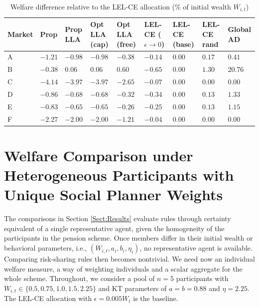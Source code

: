 \documentclass[11pt,a4paper]{article}
\theoremstyle{definition}
\theoremstyle{plain}
\theoremstyle{remark}
\newcommand{\1}{\mathbf{1}}
\begin{document}
\begin{table}[htbp]
  \centering
  \small
  \caption{Welfare difference relative to the LEL-CE allocation (\% of initial wealth $W_{i,t}$)}
  \label{tab:welfare_diff_LEL}
  \vspace{0.5em}
  \setlength{\tabcolsep}{3pt} %
  \begin{tabularx}{\textwidth}{l *{8}{Y}}
    \toprule
    \textbf{Market} & 
    \textbf{Prop} & 
    \textbf{Prop} \newline \textbf{LLA} & 
    \textbf{Opt LLA} \newline \textbf{(cap)} & 
    \textbf{Opt LLA} \newline \textbf{(free)} & 
    \textbf{LEL-CE} \newline \textbf{($\epsilon \to 0$)} & 
    \textbf{LEL-CE} \newline \textbf{(base)} & 
    \textbf{LEL-CE} \newline \textbf{rand} & 
    \textbf{Global} \newline \textbf{AD} \\
    \midrule
    A & $-1.21$ & $-0.98$ & $-0.98$ & $-0.38$ & $-0.14$ & $0.00$ & $0.17$  & $0.41$  \\
    B & $-0.38$ &  $0.06$ &  $0.06$ &  $0.60$ & $-0.65$ & $0.00$ & $1.30$  & $20.76$ \\
    C & $-4.14$ & $-3.97$ & $-3.97$ & $-2.65$ & $-0.07$ & $0.00$ & $0.00$  & $0.00$  \\
    D & $-0.86$ & $-0.68$ & $-0.68$ & $-0.32$ & $-0.34$ & $0.00$ & $0.13$  & $1.33$  \\
    E & $-0.83$ & $-0.65$ & $-0.65$ & $-0.26$ & $-0.25$ & $0.00$ & $0.13$  & $1.15$  \\
    F & $-2.27$ & $-2.00$ & $-2.00$ & $-1.21$ & $-0.04$ & $0.00$ & $0.00$  & $0.00$  \\
    \bottomrule
  \end{tabularx}
\end{table}

\section{Welfare Comparison under Heterogeneous Participants with Unique Social Planner Weights}
\label{Sect:Het_Participants_Unique_Weights}
The comparisons in Section \ref{Sect:Results} evaluate rules through certainty equivalent of a single representative agent, given the homogeneity of the participants in the pension scheme. Once members differ in their initial wealth or behavioral parameters, i.e., $(W_{i,t}, a_i, b_i, \eta_i)$, no representative agent is available. Comparing risk-sharing rules then becomes nontrivial. We need now an individual welfare measure, a way of weighting individuals and a scalar aggregate for the whole scheme. Throughout, we consider a pool of $n=5$ participants with $W_{i,t} \in \{0.5, 0.75, 1.0, 1.5, 2.25\}$ and KT parameters of $a=b=0.88$ and $\eta = 2.25$. The LEL-CE allocation with $\epsilon = 0.005 W_t$ is the baseline. 
\end{document}
